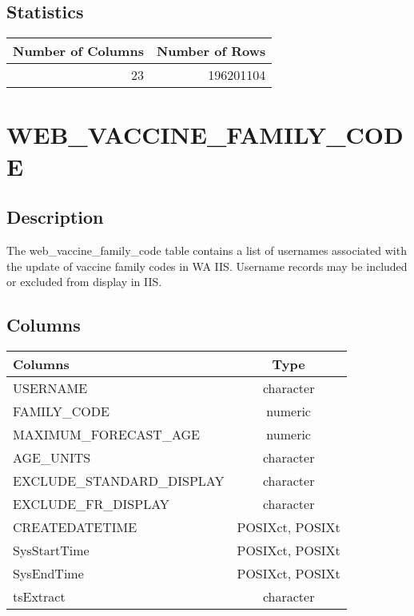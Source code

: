 \documentclass[
  letterpaper,
  DIV=11,
  numbers=noendperiod]{scrreprt}
\begin{document}
\hypertarget{statistics-52}{%
\section*{Statistics}\label{statistics-52}}

\begin{longtable}{rr}
\toprule
Number of Columns & Number of Rows \\ 
\midrule
23 & 196201104 \\ 
\bottomrule
\end{longtable}

\hypertarget{web_vaccine_family_code}{%
\chapter*{WEB\_VACCINE\_FAMILY\_CODE}\label{web_vaccine_family_code}}

\hypertarget{description-53}{%
\section*{Description}\label{description-53}}

The web\_vaccine\_family\_code table contains a list of usernames
associated with the update of vaccine family codes in WA IIS. Username
records may be included or excluded from display in IIS.

\hypertarget{columns-53}{%
\section*{Columns}\label{columns-53}}

\begin{longtable}{lc}
\toprule
Columns & Type \\ 
\midrule
USERNAME & character \\ 
FAMILY\_CODE & numeric \\ 
MAXIMUM\_FORECAST\_AGE & numeric \\ 
AGE\_UNITS & character \\ 
EXCLUDE\_STANDARD\_DISPLAY & character \\ 
EXCLUDE\_FR\_DISPLAY & character \\ 
CREATEDATETIME & POSIXct, POSIXt \\ 
SysStartTime & POSIXct, POSIXt \\ 
SysEndTime & POSIXct, POSIXt \\ 
tsExtract & character \\ 
\bottomrule
\end{longtable}
\end{document}
